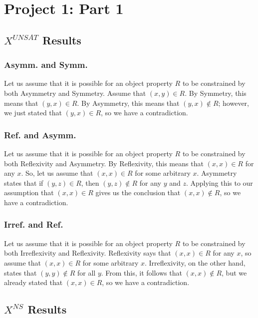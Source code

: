 \documentclass{article}
\begin{document}
  \section{Project 1: Part 1}
  \subsection{$X^{UNSAT}$ Results}
  \subsubsection{Asymm. and Symm.}

  Let us assume that it is possible for an object property $R$ to be constrained by both Asymmetry and Symmetry.
  Assume that $(x, y) \in R$.
  By Symmetry, this means that $(y, x) \in R$.
  By Asymmetry, this means that $(y, x) \not \in R$; however, we just stated that $(y, x) \in R$, so we have a contradiction.

  \subsubsection{Ref. and Asymm.}

  Let us assume that it is possible for an object property $R$ to be constrained by both Reflexivity and Asymmetry.
  By Reflexivity, this means that $(x, x) \in R$ for any $x$.
  So, let us assume that $(x, x) \in R$ for some arbitrary $x$.
  Asymmetry states that if $(y, z) \in R$, then $(y, z) \not \in R$ for any $y$ and $z$.
  Applying this to our assumption that $(x, x) \in R$ gives us the conclusion that $(x, x) \not \in R$, so we have a contradiction.

  \subsubsection{Irref. and Ref.}

  Let us assume that it is possible for an object property $R$ to be constrained by both Irreflexivity and Reflexivity.
  Reflexivity says that $(x, x) \in R$ for any $x$, so assume that $(x, x) \in R$ for some arbitrary $x$.
  Irreflexivity, on the other hand, states that $(y, y) \not \in R$ for all $y$.
  From this, it follows that $(x, x) \not \in R$, but we already stated that $(x, x) \in R$, so we have a contradiction.

  \subsection{$X^{NS}$ Results}
\end{document}
